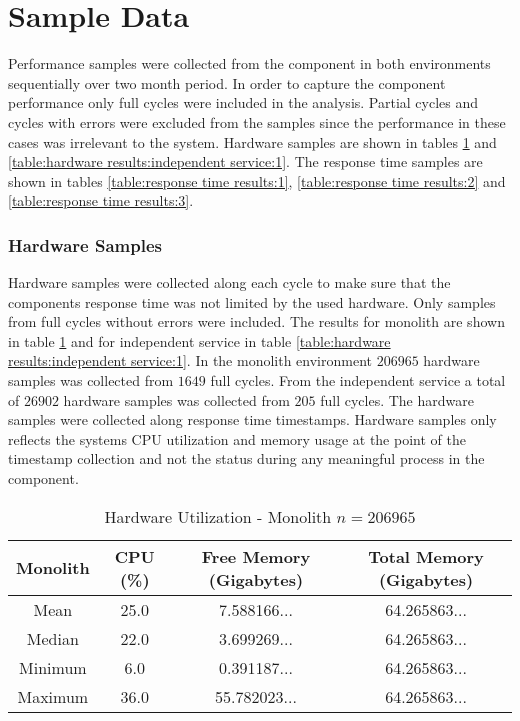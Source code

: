 \section{Sample Data}
Performance samples were collected from the component in both environments sequentially over two month period.
In order to capture the component performance only full cycles were included in the analysis.
Partial cycles and cycles with errors were excluded from the samples since the performance in these cases was irrelevant to the system.
Hardware samples are shown in tables \ref{table:hardware results:monolith:1} and \ref{table:hardware results:independent service:1}.
The response time samples are shown in tables \ref{table:response time results:1}, \ref{table:response time results:2} and \ref{table:response time results:3}.

\subsubsection{Hardware Samples}
Hardware samples were collected along each cycle to make sure that the components response time was not limited by the used hardware.
Only samples from full cycles without errors were included.
The results for monolith are shown in table \ref{table:hardware results:monolith:1} and for independent service in table \ref{table:hardware results:independent service:1}.
In the monolith environment $206965$ hardware samples was collected from $1649$ full cycles.
From the independent service a total of $26902$ hardware samples was collected from $205$ full cycles.
The hardware samples were collected along response time timestamps.
Hardware samples only reflects the systems CPU utilization and memory usage at the point of the timestamp collection and not the status during any meaningful process in the component.

\begin{table}[ht!]
    \begin{tabular}{|c c c c|} 
        \hline
        Monolith
        & CPU (\%)
        & Free Memory (Gigabytes)
        & Total Memory (Gigabytes) \\ [0.5ex] 
        
        \hline\hline
        Mean
        & 25.0
        & 7.588166...
        & 64.265863... \\ 
        
        Median
        & 22.0
        & 3.699269...
        & 64.265863... \\ 

        Minimum
        & 6.0
        & 0.391187...
        & 64.265863... \\ 
        
        Maximum
        & 36.0
        & 55.782023...
        & 64.265863... \\
        \hline
    \end{tabular}
    \caption{Hardware Utilization - Monolith $n=206 965$}
    \label{table:hardware results:monolith:1}
\end{table}

